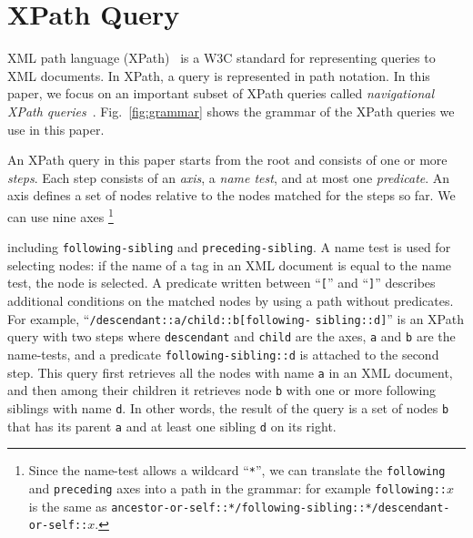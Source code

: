 \section{XPath Query}

XML path language (XPath)~\cite{XPath} is a W3C standard for representing queries
to XML documents. In XPath, a query is represented in path
notation. In this paper, we focus on an important subset of XPath queries called \emph{navigational XPath queries}~\cite{xpathcategory}. 
Fig.~\ref{fig:grammar} shows the grammar of the XPath queries we use in this paper.

An XPath query in this paper starts from the root and consists of one or more \emph{steps}.
Each step consists of an \emph{axis}, a \emph{name test}, and at most one \emph{predicate}. 
An axis defines a set of nodes relative to the nodes matched for the steps so far.
We can use nine axes
\footnote{%
Since the name-test allows a wildcard ``\texttt{*}'', we can translate the \texttt{following} and \texttt{preceding} axes into a path in the grammar: for example \texttt{following::}$x$ is the same as \texttt{ancestor-or-self::*/}\break\texttt{following-sibling::*/descendant-or-self::}$x$. }

including \verb|following-sibling| and \verb|preceding-sibling|.
A name test is used for selecting nodes: if the name of a tag in an XML document is equal to the name test, the node is selected.  A predicate written 
between ``\verb|[|'' and ``\verb|]|'' describes additional conditions on the matched nodes by using a path without predicates.
For example, ``\verb|/descendant::a/child::b[following-|\break
\verb|sibling::d]|'' is an XPath query with two steps where \verb|descendant| 
and \verb|child| are the axes, \verb|a| and \verb|b| are the name-tests, and a predicate \verb|following-sibling::d| is attached to the second step. 
This query first retrieves all the nodes with name \verb|a| in an XML document, and then among their children it retrieves node \verb|b| with one or more following siblings with name \verb|d|.
In other words, the result of the query is a set of nodes \verb|b| that has its parent \verb|a| and at least one sibling \verb|d| on its right.

